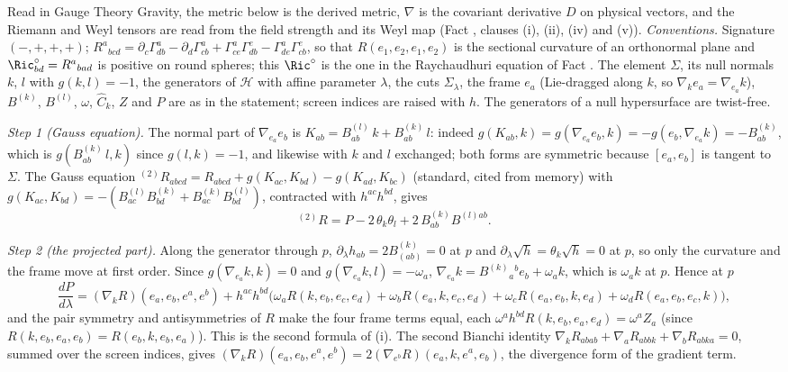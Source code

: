 Read in Gauge Theory Gravity, the metric below is the derived metric, $\nabla$ is the covariant derivative $D$ on physical vectors, and the Riemann and Weyl tensors are read from the field strength and its Weyl map (Fact , clauses (i), (ii), (iv) and (v)). \emph{Conventions.} Signature $(-,+,+,+)$; $R^{a}{}_{bcd} = \partial_{c}\Gamma^{a}_{db} - \partial_{d}\Gamma^{a}_{cb} + \Gamma^{a}_{ce}\Gamma^{e}_{db} - \Gamma^{a}_{de}\Gamma^{e}_{cb}$, so that $R(e_{1},e_{2},e_{1},e_{2})$ is the sectional curvature of an orthonormal plane and $\Ric^{\circ}_{bd} = R^{a}{}_{bad}$ is positive on round spheres; this $\Ric^{\circ}$ is the one in the Raychaudhuri equation of Fact . The element $\Sigma$, its null normals $k$, $l$ with $g(k,l) = -1$, the generators of $\mathcal{H}$ with affine parameter $\lambda$, the cuts $\Sigma_{\lambda}$, the frame $e_{a}$ (Lie-dragged along $k$, so $\nabla_{k}e_{a} = \nabla_{e_{a}}k$), $B^{(k)}$, $B^{(l)}$, $\omega$, $\widehat{C}_{k}$, $Z$ and $P$ are as in the statement; screen indices are raised with $h$. The generators of a null hypersurface are twist-free.

\emph{Step 1 (Gauss equation).} The normal part of $\nabla_{e_{a}}e_{b}$ is $K_{ab} = B^{(l)}_{ab}\,k + B^{(k)}_{ab}\,l$: indeed $g(K_{ab}, k) = g(\nabla_{e_{a}}e_{b}, k) = -g(e_{b}, \nabla_{e_{a}}k) = -B^{(k)}_{ab}$, which is $g(B^{(k)}_{ab}\,l, k)$ since $g(l,k) = -1$, and likewise with $k$ and $l$ exchanged; both forms are symmetric because $[e_{a}, e_{b}]$ is tangent to $\Sigma$. The Gauss equation ${}^{(2)}\!R_{abcd} = R_{abcd} + g(K_{ac},K_{bd}) - g(K_{ad},K_{bc})$ (standard, cited from memory) with $g(K_{ac},K_{bd}) = -(B^{(l)}_{ac}B^{(k)}_{bd} + B^{(k)}_{ac}B^{(l)}_{bd})$, contracted with $h^{ac}h^{bd}$, gives
\[
{}^{(2)}\!R = P - 2\,\theta_{k}\theta_{l} + 2\,B^{(k)}_{ab}B^{(l)ab} .
\]

\emph{Step 2 (the projected part).} Along the generator through $p$, $\partial_{\lambda}h_{ab} = 2B^{(k)}_{(ab)} = 0$ at $p$ and $\partial_{\lambda}\sqrt{h} = \theta_{k}\sqrt{h} = 0$ at $p$, so only the curvature and the frame move at first order. Since $g(\nabla_{e_{a}}k, k) = 0$ and $g(\nabla_{e_{a}}k, l) = -\omega_{a}$, $\nabla_{e_{a}}k = B^{(k)}{}_{a}{}^{b}e_{b} + \omega_{a}k$, which is $\omega_{a}k$ at $p$. Hence at $p$
\[
\frac{dP}{d\lambda} = (\nabla_{k}R)(e_{a},e_{b},e^{a},e^{b}) + h^{ac}h^{bd}\big(\omega_{a}R(k,e_{b},e_{c},e_{d}) + \omega_{b}R(e_{a},k,e_{c},e_{d}) + \omega_{c}R(e_{a},e_{b},k,e_{d}) + \omega_{d}R(e_{a},e_{b},e_{c},k)\big),
\]
and the pair symmetry and antisymmetries of $R$ make the four frame terms equal, each $\omega^{a}h^{bd}R(k,e_{b},e_{a},e_{d}) = \omega^{a}Z_{a}$ (since $R(k,e_{b},e_{a},e_{b}) = R(e_{b},k,e_{b},e_{a})$). This is the second formula of (i). The second Bianchi identity $\nabla_{k}R_{abab} + \nabla_{a}R_{abbk} + \nabla_{b}R_{abka} = 0$, summed over the screen indices, gives $(\nabla_{k}R)(e_{a},e_{b},e^{a},e^{b}) = 2(\nabla_{e^{b}}R)(e_{a},k,e^{a},e_{b})$, the divergence form of the gradient term.


